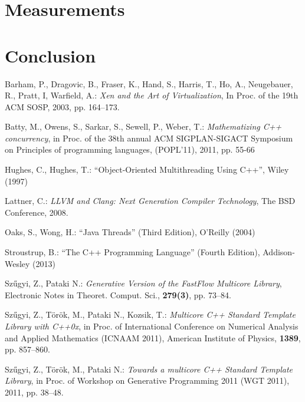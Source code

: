 \documentclass{article}
\begin{document}
\label{architecture}

\section{Measurements}
\label{measurements}

\section{Conclusion}
\label{conc}

\begin{thebibliography}{10}

Barham, P., Dragovic, B., Fraser, K., Hand, S., Harris, T., Ho, A., Neugebauer, R., Pratt, I,
Warfield, A.: \emph{Xen and the Art of Virtualization}, In Proc. of the 19th ACM SOSP, 2003,
pp. 164--173.

Batty, M., Owens, S., Sarkar, S., Sewell, P., Weber, T.: \emph{Mathematizing C++ concurrency},
in Proc. of the 38th annual ACM SIGPLAN-SIGACT Symposium on Principles of programming languages,
(POPL'11), 2011, pp. 55-66

Hughes, C., Hughes, T.: ``Object-Oriented Multithreading Using C++'', Wiley (1997)

Lattner, C.: \emph{{LLVM} and {C}lang: Next Generation Compiler Technology}, The BSD Conference,
2008.

Oaks, S., Wong, H.: ``Java Threads'' (Third Edition), O'Reilly (2004)

Stroustrup, B.: ``The C++ Programming Language'' (Fourth Edition), Addison-Wesley (2013)

Sz\H{u}gyi, Z., Pataki N.: \emph{Generative Version of the FastFlow Multicore Library},
Electronic Notes in Theoret. Comput. Sci., \textbf{279(3)}, pp. 73--84.

Sz\H{u}gyi, Z., T\"or\"ok, M., Pataki N., Kozsik, T.: \emph{Multicore C++ Standard Template Library
with C++0x}, in Proc. of International Conference on Numerical Analysis and Applied
Mathematics (ICNAAM 2011), American Institute of Physics, \textbf{1389}, pp. 857--860.

Sz\H{u}gyi, Z., T\"or\"ok, M., Pataki N.: \emph{Towards a multicore C++ Standard Template Library},
in Proc. of Workshop on Generative Programming 2011 (WGT 2011), 2011, pp. 38--48.


\end{thebibliography}
\end{document}
